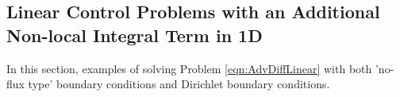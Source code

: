 %
%
%
%


\subsection{Linear Control Problems with an Additional Non-local Integral Term in 1D}
In this section, examples of solving Problem \eqref{eqn:AdvDiffLinear} with both 'no-flux type' boundary conditions and Dirichlet boundary conditions.
